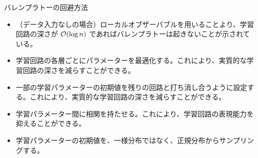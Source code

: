 \documentclass[dvipdfmx,10pt,aspectratio=169]{beamer}
\begin{document}
\begin{frame}{バレンプラトーの回避方法}
    \begin{itemize}
        \item （データ入力なしの場合）ローカルオブザーバブルを用いることより、学習回路の深さが $\order{\log{n}}$ であればバレンプラトーは起きないことが示されている。%
        \item 学習回路の各層ごとにパラメーターを最適化する。これにより、実質的な学習回路の深さを減らすことができる。%
        \item 一部の学習パラメーターの初期値を残りの回路と打ち消し合うように設定する。これにより、実質的な学習回路の深さを減らすことができる。%
        \item 学習パラメーター間に相関を持たせる。これにより、学習回路の表現能力を抑えることができる。%
        \item 学習パラメーターの初期値を、一様分布ではなく、正規分布からサンプリングする。%
    \end{itemize}
\end{frame}
\end{document}
